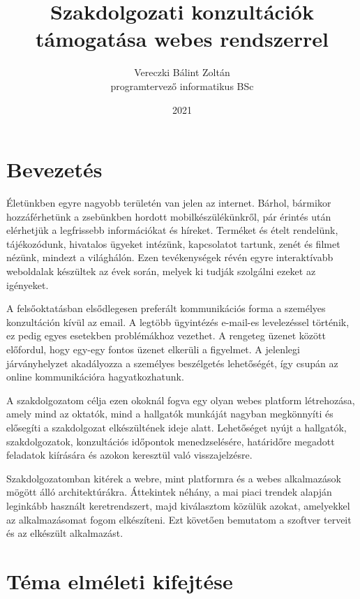 \documentclass[
]{thesis-ekf}
\theoremstyle{definition}
\theoremstyle{remark}
\begin{document}
	\title{Szakdolgozati konzultációk támogatása webes rendszerrel}
	\author{Vereczki Bálint Zoltán\\programtervező informatikus BSc}
	\date{2021}
	\maketitle
	\tableofcontents
	
	\chapter*{Bevezetés}
	Életünkben egyre nagyobb területén van jelen az internet. Bárhol, bármikor hozzáférhetünk a zsebünkben hordott mobilkészülékünkről, pár érintés után elérhetjük a legfrissebb információkat és híreket. Terméket és ételt rendelünk, tájékozódunk, hivatalos ügyeket intézünk, kapcsolatot tartunk, zenét és filmet nézünk, mindezt a világhálón. Ezen tevékenységek révén egyre interaktívabb weboldalak készültek az évek során, melyek ki tudják szolgálni ezeket az igényeket.
	
	A felsőoktatásban elsődlegesen preferált kommunikációs forma a személyes konzultáción kívül az email. A legtöbb ügyintézés e-mail-es levelezéssel történik, ez pedig egyes esetekben problémákhoz vezethet. A rengeteg üzenet között előfordul, hogy egy-egy fontos üzenet elkerüli a figyelmet. A jelenlegi járványhelyzet akadályozza a személyes beszélgetés lehetőségét, így csupán az online kommunikációra hagyatkozhatunk.
	
	A szakdolgozatom célja ezen okoknál fogva egy olyan webes platform létrehozása, amely mind az oktatók, mind a hallgatók munkáját nagyban megkönnyíti és elősegíti a szakdolgozat elkészültének ideje alatt. Lehetőséget nyújt a hallgatók, szakdolgozatok, konzultációs időpontok menedzselésére, határidőre megadott feladatok kiírására és azokon keresztül való visszajelzésre.
	
	Szakdolgozatomban kitérek a webre, mint platformra és a webes alkalmazások mögött álló architektúrákra. Áttekintek néhány, a mai piaci trendek alapján leginkább használt keretrendszert, majd kiválasztom közülük azokat, amelyekkel az alkalmazásomat fogom elkészíteni. Ezt követően bemutatom a szoftver terveit és az elkészült alkalmazást.
	
	\chapter{Téma elméleti kifejtése}
\end{document}
